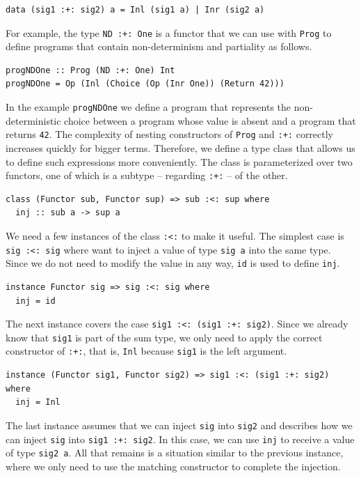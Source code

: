 \documentclass[a4paper, 11pt, fleqn, twoside]{scrreprt}
\newcommand{\hinl}[1]{\texttt{#1}}
\begin{document}
\begin{verbatim}
data (sig1 :+: sig2) a = Inl (sig1 a) | Inr (sig2 a)
\end{verbatim}

For example, the type \hinl{ND :+: One} is a functor that we can use with 
\hinl{Prog} to define programs that contain non-determinism and partiality as 
follows.

\begin{verbatim}
progNDOne :: Prog (ND :+: One) Int
progNDOne = Op (Inl (Choice (Op (Inr One)) (Return 42)))
\end{verbatim}

In the example \hinl{progNDOne} we define a program that represents the 
non-deterministic choice between a program whose value is absent and a program 
that returns \hinl{42}. The complexity of nesting constructors of \hinl{Prog} 
and \hinl{:+:} correctly increases quickly for bigger terms. Therefore, we 
define a type class that allows us to define such expressions more conveniently.
The class is parameterized over two functors, one of which is a subtype -- 
regarding \hinl{:+:} -- of the other.

\begin{verbatim}
class (Functor sub, Functor sup) => sub :<: sup where
  inj :: sub a -> sup a
\end{verbatim}

We need a few instances of the class \hinl{:<:} to make it useful. The simplest 
case is \hinl{sig :<: sig} where want to inject a value of type \hinl{sig a} 
into the same type. Since we do not need to modify the value in any way, 
\hinl{id} is used to define \hinl{inj}. 

\begin{verbatim}
instance Functor sig => sig :<: sig where
  inj = id  
\end{verbatim}

The next instance covers the case \hinl{sig1 :<: (sig1 :+: sig2)}. Since we 
already know that \hinl{sig1} is part of the sum type, we only need to apply 
the correct constructor of \hinl{:+:}, that is, \hinl{Inl} because \hinl{sig1} 
is the left argument.

\begin{verbatim}
instance (Functor sig1, Functor sig2) => sig1 :<: (sig1 :+: sig2) where
  inj = Inl
\end{verbatim}

The last instance assumes that we can inject \hinl{sig} into \hinl{sig2} and 
describes how we can inject \hinl{sig} into \hinl{sig1 :+: sig2}. In this case, 
we can use \hinl{inj} to receive a value of type \hinl{sig2 a}. All that 
remains is a situation similar to the previous instance, where we only need to 
use the matching constructor to complete the injection.
 
\end{document}
